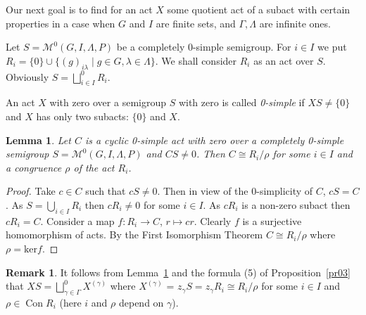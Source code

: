 \documentclass{birkau}
\numberwithin{equation}{section}
\theoremstyle{plain}
\newtheorem{lemma}[theorem]{Lemma}
\theoremstyle{definition}
\newtheorem{remark}[theorem]{Remark}
\DeclareMathOperator{\Con}{Con}
\begin{document}
	Our next goal is to find for an act $X$ some quotient act of a subact with certain properties in a case when $G$ and $I$ are finite sets, and $\Gamma, \Lambda$ are infinite ones.
	
	Let $S=\mathcal{M}^0(G,I,\Lambda,P)$ be a completely 0-simple semigroup. For $i \in I$ we put $R_i = \{0\} \cup \{(g)_{i\lambda} \mid g \in G, \lambda \in \Lambda\}$. We shall consider $R_i$ as an act over $S$. Obviously $S = \bigsqcup_{i \in I}^0 R_i$.
	
	An act $X$ with zero over a semigroup $S$ with zero is called \textit{0-simple} if $XS \neq \{0\}$ and $X$ has only two subacts: $\{0\}$ and $X$.
	
	\begin{lemma} \label{lemma:A}
	    Let $C$ is a cyclic 0-simple act with zero over a completely 0-simple semigroup $S=\mathcal{M}^0(G,I,\Lambda,P)$ and $CS \neq 0$. Then $C \cong R_i/\rho$ for some $i \in I$ and a congruence $\rho$ of the act $R_i$.
	\end{lemma}
	\begin{proof}
	    Take $c \in C$ such that $cS \neq 0$. Then in view of the 0-simplicity of $C$, $cS=C$. As $S = \bigcup_{i \in I} R_i$ then $cR_i \neq 0$ for some $i \in I$. As $cR_i$ is a non-zero subact then $cR_i = C$. Consider a map $f:R_i \to C$, $r \mapsto cr$. Clearly $f$ is a surjective homomorphism of acts. By the First Isomorphism Theorem $C \cong R_i/\rho$ where $\rho = \text{ker} f$.
	\end{proof}
	
	\begin{remark}
	    It follows from Lemma~\ref{lemma:A} and the formula (5) of Proposition~\ref{pr03} that $XS = \bigsqcup_{\gamma \in \Gamma}^{0} X^{(\gamma)}$ where $X^{(\gamma)}$ = $z_{\gamma}S = z_{\gamma}R_i \cong R_i/\rho$ for some $i \in I$ and $\rho \in \Con R_i$ (here $i$ and $\rho$ depend on $\gamma$).
	\end{remark}
	
\end{document}
